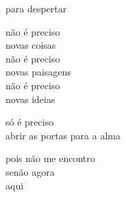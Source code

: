 para despertar

não é preciso\\
novas coisas\\
não é preciso\\
novas paisagens\\
não é preciso\\
novas ideias

só é preciso\\
abrir as portas para a alma

pois não me encontro\\
senão agora\\
aqui
